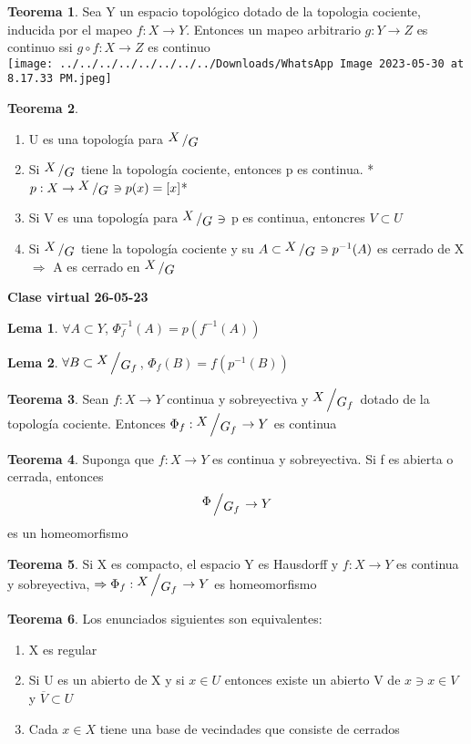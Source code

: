 \documentclass{article}
\theoremstyle{definition}
\newtheorem{theorem}{Teorema}[section]
\newtheorem{lemma}{Lema}[section]
\newcommand{\bigslant}[2]{{\raisebox{.2em}{$#1$}\left/\raisebox{-.2em}{$#2$}\right.}}
\begin{document}

\begin{theorem}
	Sea Y un espacio topológico dotado de la topologia cociente, inducida por el mapeo $f:X\to Y$. Entonces un mapeo arbitrario $g:Y\to Z$ es continuo ssi $g\circ f:X\to Z$ es continuo\\
\texttt{[image: ../../../../../../../../Downloads/WhatsApp Image 2023-05-30 at 8.17.33 PM.jpeg]} 
\end{theorem}


\begin{theorem}
	\begin{enumerate}
		\item U es una topología para $\bigslant{X}{G}$
		\item Si $\bigslant{X}{G}$ tiene la topología cociente, entonces p es continua. *$p:X\to\bigslant{X}{G}\ni p(x)=[x]$*
		\item Si V es una topología para $\bigslant{X}{G}\ni$ p es continua, entoncres $V\subset U$
		\item Si $\bigslant{X}{G}$ tiene la topología cociente y su $A\subset \bigslant{X}{G}\ni p^{-1}(A)$ es cerrado de X $\Rightarrow$ A es cerrado en $\bigslant{X}{G}$
	\end{enumerate}
\end{theorem}


\textbf{Clase virtual 26-05-23}
\begin{lemma}
	$\forall A\subset Y$, $\Phi_f^{-1}(A)=p(f^{-1}(A))$
\end{lemma}
\begin{lemma}
	$\forall B\subset \bigslant{X}{G_f}$, $\Phi_f(B)=f(p^{-1}(B))$
\end{lemma}
\begin{theorem}
	Sean $f:X\to Y$ continua y sobreyectiva y  $\bigslant{X}{G_f}$ dotado de la topología cociente. Entonces $\Phi_f:\bigslant{X}{G_f}\to Y$ es continua
\end{theorem}
\begin{theorem}
	Suponga que $f:X\to Y$ es continua y sobreyectiva. Si f es abierta o cerrada, entonces 
	\[ \bigslant{\Phi}{G_f}\to Y\]
	es un homeomorfismo
\end{theorem}
\begin{theorem}

	Si X es compacto, el espacio Y es Hausdorff y $f:X\to Y$ es continua y sobreyectiva, $\Rightarrow \Phi_f:\bigslant{X}{G_f}\to Y$ es homeomorfismo
\end{theorem}
\begin{theorem}
	Los enunciados siguientes son equivalentes:
	\begin{enumerate}
		\item X es regular
		\item Si U es un abierto de X y si $x\in U$ entonces existe un abierto V de $x\ni x\in V$ y $\overline{V}\subset U$
		\item Cada $x\in X$ tiene una base de vecindades que consiste de cerrados
	\end{enumerate}
\end{theorem}
\end{document}

